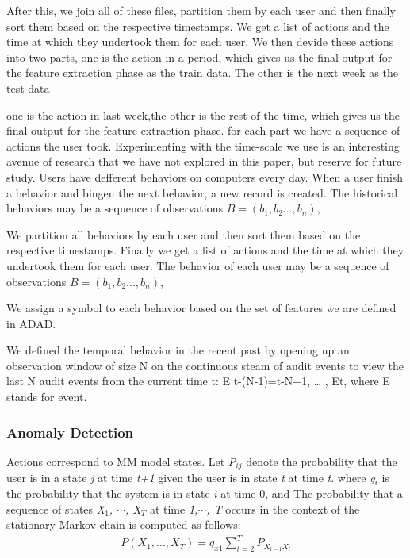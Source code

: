 \documentclass[conference]{IEEEtran}
\begin{document}
After this, we join all of these files, partition them by each user and then finally sort them based on the respective timestamps. We get a list of actions and the time at which they undertook them for each user.
We then devide these actions into two parts, one is the action in a period, which gives us the final output for the feature extraction phase as the train data. The other is the next week as the test data

one is the action in last week,the other is the rest of the time, which gives us the final output for the feature extraction phase. for each part we have a sequence of actions the user took. Experimenting with the time-scale we use is an interesting avenue of research that we have not explored in this paper, but reserve for future study. 
\fi
Users have defferent behaviors on computers every day. When a user finish a behavior and bingen the next behavior, a new record is created. 
The historical behaviors may be a sequence of observations \emph{$B=(b_1,b_2...,b_n)$},

We partition all behaviors by each user and then sort them based on the respective timestamps. Finally we get a list of actions and the time at which they undertook them for each user. The behavior of each user may be a sequence of observations \emph{$B=(b_1,b_2...,b_n)$},

We assign a symbol to each behavior based on the set of features we are defined in ADAD.


We defined the temporal behavior in the recent past
by opening up an observation window of size N on
the continuous steam of audit events to view the last
N audit events from the current time t:
E
t-(N-1)=t-N+1, … , Et, where E stands for event.

\subsubsection{Anomaly Detection}
\iffalse
Actions correspond to MM model states. Let \emph{P$_{ij}$} denote the probability that the user is in a state \emph{j} at time \emph{t+1} given the user is in state \emph{t} at time \emph{t}. 
where \emph{q$_{i}$} is the probability that the system is in state \emph{i} at time 0, and 
The probability that a sequence of states \emph{X$_1$, $\cdots$, X$_T$} at time \emph{1,$\cdots$, T} occurs in the context of the stationary Markov chain is computed as follows:
\begin{align}
P(X_1,...,X_T)=q_{x1}\sum_{t=2}^T P_{X_{t-1}X_t}
\end{align}
\end{document}
